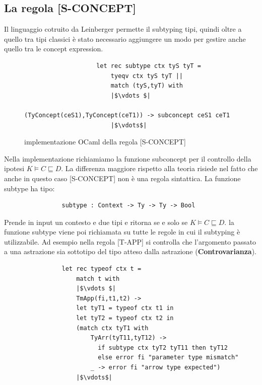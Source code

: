             \subsection{La regola [S-CONCEPT]}
            Il linguaggio cotruito da Leinberger permette il subtyping tipi, quindi oltre a quello tra tipi classici è stato necessario aggiungere un modo per gestire
            anche quello tra le concept expression.
            \begin{figure}[h]
                \begin{verbatim}
                    let rec subtype ctx tyS tyT =
                        tyeqv ctx tyS tyT ||
                        match (tyS,tyT) with
                        |$\vdots $|
                            (TyConcept(ceS1),TyConcept(ceT1)) -> subconcept ceS1 ceT1
                        |$\vdots$|
                \end{verbatim}
            \caption{implementazione OCaml della regola [S-CONCEPT]}
            \end{figure}
            Nella implementazione richiamiamo la funzione subconcept per il controllo della ipotesi $K \vDash C \sqsubseteq D$. La differenza maggiore rispetto alla teoria
            risiede nel fatto che anche in questo caso [S-CONCEPT] non è una regola sintattica. La funzione subtype ha tipo:
            \begin{verbatim}
                subtype : Context -> Ty -> Ty -> Bool
            \end{verbatim}
            Prende in input un contesto e due tipi e ritorna  se e solo se $K \vDash C \sqsubseteq D$. la funzione subtype viene poi richiamata su tutte le regole
            in cui il subtyping è utilizzabile. Ad esempio nella regola [T-APP] si controlla che l'argomento passato a una astrazione sia sottotipo del tipo atteso dalla astrazione (\textbf{Controvarianza}).
            \begin{verbatim}
                let rec typeof ctx t =
                    match t with
                    |$\vdots $|
                    TmApp(fi,t1,t2) ->
                    let tyT1 = typeof ctx t1 in
                    let tyT2 = typeof ctx t2 in
                    (match ctx tyT1 with
                        TyArr(tyT11,tyT12) ->
                          if subtype ctx tyT2 tyT11 then tyT12
                          else error fi "parameter type mismatch"
                        _ -> error fi "arrow type expected")
                    |$\vdots$|
            \end{verbatim}












        
        